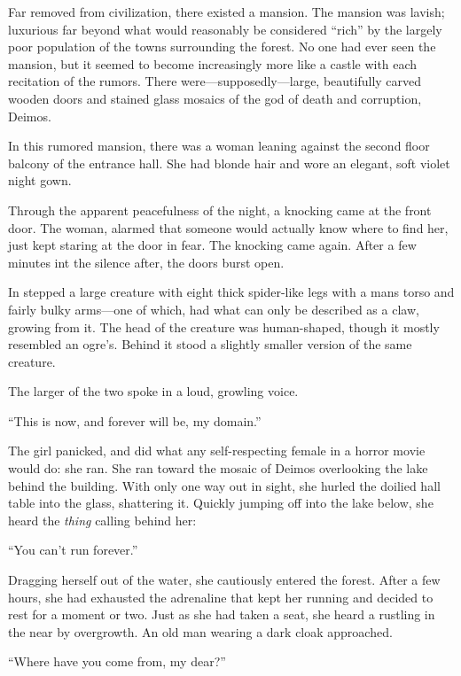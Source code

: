 \noindent
Far removed from civilization, there existed a mansion.
The mansion was lavish; luxurious far beyond what would reasonably be considered ``rich'' by the largely poor population of the towns surrounding the forest.
No one had ever seen the mansion, but it seemed to become increasingly more like a castle with each recitation of the rumors.
There were---supposedly---large, beautifully carved wooden doors and stained glass mosaics of the god of death and corruption, Deimos.


In this rumored mansion, there was a woman leaning against the second floor balcony of the entrance hall.
She had blonde hair and wore an elegant, soft violet night gown.


Through the apparent peacefulness of the night, a knocking came at the front door.
The woman, alarmed that someone would actually know where to find her, just kept staring at the door in fear.
The knocking came again.  After a few minutes int the silence after, the doors burst open.


In stepped a large creature with eight thick spider-like legs with a mans torso and fairly bulky arms---one of which, had what can only be described as a claw, growing from it.
The head of the creature was human-shaped, though it mostly resembled an ogre's.
Behind it stood a slightly smaller version of the same creature.


The larger of the two spoke in a loud, growling voice.
\VV


``This is now, and forever will be, my domain.''
\VV


\noindent
The girl panicked, and did what any self-respecting female in a horror movie would do: she ran.
She ran toward the mosaic of Deimos overlooking the lake behind the building.
With only one way out in sight, she hurled the doilied hall table into the glass, shattering it.
Quickly jumping off into the lake below, she heard the \textit{thing} calling behind her:
\VV


``You can't run forever.''
\VV


\noindent
Dragging herself out of the water, she cautiously entered the forest.
After a few hours, she had exhausted the adrenaline that kept her running and decided to rest for a moment or two.
Just as she had taken a seat, she heard a rustling in the near by overgrowth.
An old man wearing a dark cloak approached.
\VV


``Where have you come from, my dear?''
\VV


